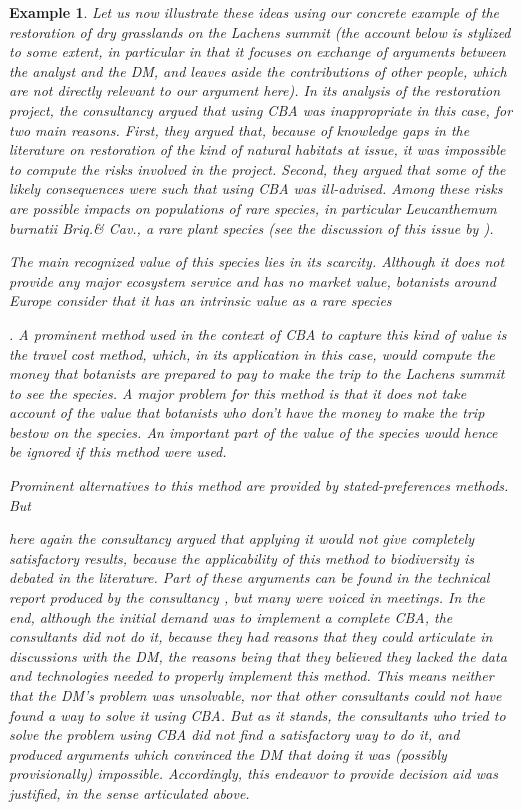 \documentclass[preprint, french, english, 11pt, authoryear]{elsarticle}%
\newtheorem{example}{Example}
\begin{document}
\begin{example}
Let us now illustrate these ideas using our concrete example of the restoration of dry grasslands on the Lachens summit (the account below is stylized to some extent, in particular in that it focuses on exchange of arguments between the analyst and the \ac{DM}, and leaves aside the contributions of other people, which are not directly relevant to our argument here). In its analysis of the restoration project, the consultancy argued that using \ac{CBA} was inappropriate in this case, for two main reasons. First, they argued that, because of knowledge gaps in the literature on restoration of the kind of natural habitats at issue, it was impossible to compute the risks involved in the project. Second, they argued that some of the likely consequences were such that using \ac{CBA} was ill-advised. Among these risks are possible impacts on populations of rare species, in particular \emph{Leucanthemum burnatii} Briq.\@ \& Cav.\@, a rare plant species (see the discussion of this issue by \citet{meinard_ethical_2016}).
\begin{changebar}The main recognized value of this species lies in its scarcity. Although it does not provide any major ecosystem service and has no market value, botanists around Europe consider that it has an intrinsic value as a rare species\end{changebar}.
A prominent method used in the context of \ac{CBA} to capture this kind of value is the travel cost method, which, in its application in this case, would compute the money that botanists are prepared to pay to make the trip to the Lachens summit to see the species.
A major problem for this method is that it does not take account of the value that botanists who don't have the money to make the trip bestow on the species. An important part of the value of the species would hence be ignored if this method were used.
\begin{changebar}Prominent alternatives to this method are provided by stated-preferences methods. But\end{changebar} here again the consultancy argued that applying it would not give completely satisfactory results, because the applicability of this method to biodiversity is debated in the literature.
Part of these arguments can be found in the technical report produced by the consultancy \citep{meinard_etude_2015}, but many were voiced in meetings.
In the end, although the initial demand was to implement a complete \ac{CBA}, the consultants did not do it, because they had reasons that they could articulate in discussions with the \ac{DM}, the reasons being that they believed they lacked the data and technologies needed to properly implement this method. This means neither that the \ac{DM}'s problem was unsolvable, nor that other consultants could not have found a way to solve it using \ac{CBA}.
But as it stands, the consultants who tried to solve the problem using \ac{CBA} did not find a satisfactory way to do it, and produced arguments which convinced the \ac{DM} that doing it was (possibly provisionally) impossible.
Accordingly, this endeavor to provide decision aid was justified, in the sense articulated above.
\end{example}
\end{document}
